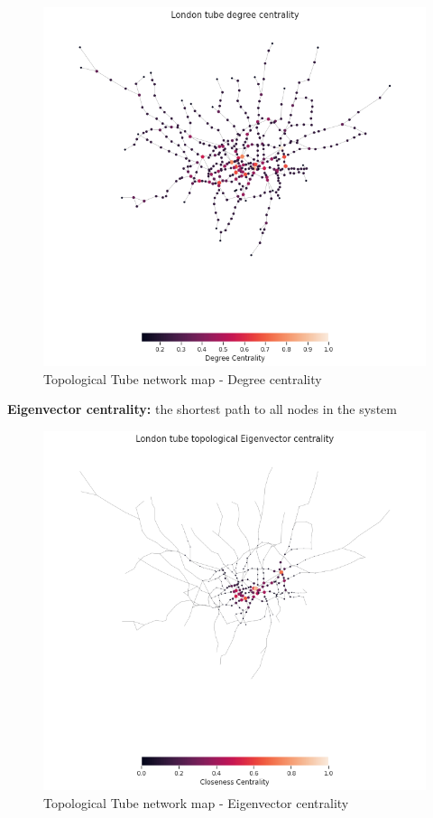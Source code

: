 \documentclass[10pt]{report}
\numberwithin{figure}{section}
\numberwithin{table}{section}
\begin{document}
    \begin{figure}[htp]
        \centering
        \includegraphics[width=14cm]{Image/Part1_topologicalmap_degree.png}
        \caption{Topological Tube network map - Degree centrality}
        \label{fig:galaxy}
    \end{figure}   


        
  \vspace{5mm} %
        
        \textbf{Eigenvector centrality:}  the shortest path to all nodes in the system
    \begin{figure}[htp]
        \centering
        \includegraphics[width=14cm]{Image/Part1_topologicalmap_eigenvector.png}
        \caption{Topological Tube network map - Eigenvector centrality}
        \label{fig:galaxy}
    \end{figure} 
\end{document}
